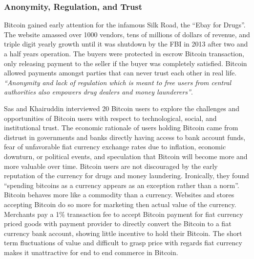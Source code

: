 \documentclass[a4paper,12pt]{article} %
\begin{document}
\subsubsection{Anonymity, Regulation, and Trust} \label{sssec:2:anonymityRegulationTrust}

Bitcoin gained early attention for the infamous Silk Road, the ``Ebay for Drugs''\cite{EbayForDrugs}. The website amassed over 1000 vendors, tens of millions of dollars of revenue, and triple digit yearly growth until it was shutdown by the FBI in 2013 after two and a half years operation\cite{NotAnEbayForDrugs}. The buyers were protected in escrow Bitcoin transaction, only releasing payment to the seller if the buyer was completely satisfied. Bitcoin allowed payments amongst parties that can never trust each other in real life. \textit{``Anonymity and lack of regulation which is meant to free users from central authorities also empowers drug dealers and money launderers''}\cite{Ali:2015:BPU:2990603.2990632}.

Sas and Khairuddin interviewed 20 Bitcoin users to explore the challenges and opportunities of Bitcoin users with respect to technological, social, and institutional trust\cite{sas2016design}. The economic rationale of users holding Bitcoin came from distrust in governments and banks directly having access to bank account funds, fear of unfavorable fiat currency exchange rates due to inflation, economic downturn, or political events, and speculation that Bitcoin will become more and more valuable over time. Bitcoin users are not discouraged by the early reputation of the currency for drugs and money laundering. Ironically, they found ``spending bitcoins as a currency appears as an exception rather than a norm''. Bitcoin behaves more like a commodity than a currency. Websites and stores accepting Bitcoin do so more for marketing then actual value of the currency. Merchants pay a 1\% transaction fee to accept Bitcoin payment for fiat currency priced goods with payment provider to directly convert the Bitcoin to a fiat currency bank account, showing little incentive to hold their Bitcoin. The short term fluctuations of value and difficult to grasp price with regards fiat currency makes it unattractive for end to end commerce in Bitcoin.
\end{document}
